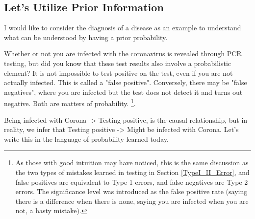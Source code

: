 \documentclass{ltjsbook}
\begin{document}
\subsection{Let's Utilize Prior Information}
I would like to consider the diagnosis of a disease as an example to understand what can be understood by having a prior probability.

Whether or not you are infected with the coronavirus is revealed through PCR testing, but did you know that these test results also involve a probabilistic element? It is not impossible to test positive on the test, even if you are not actually infected. This is called a "false positive". Conversely, there may be "false negatives", where you are infected but the test does not detect it and turns out negative. Both are matters of probability. \footnote{As those with good intuition may have noticed, this is the same discussion as the two types of mistakes learned in testing in Section \ref{TypeI_II_Error}, and false positives are equivalent to Type 1 errors, and false negatives are Type 2 errors. The significance level was introduced as the false positive rate (saying there is a difference when there is none, saying you are infected when you are not, a hasty mistake).}.

Being infected with Corona -> Testing positive, is the causal relationship, but in reality, we infer that Testing positive -> Might be infected with Corona. Let's write this in the language of probability learned today.
\end{document}
